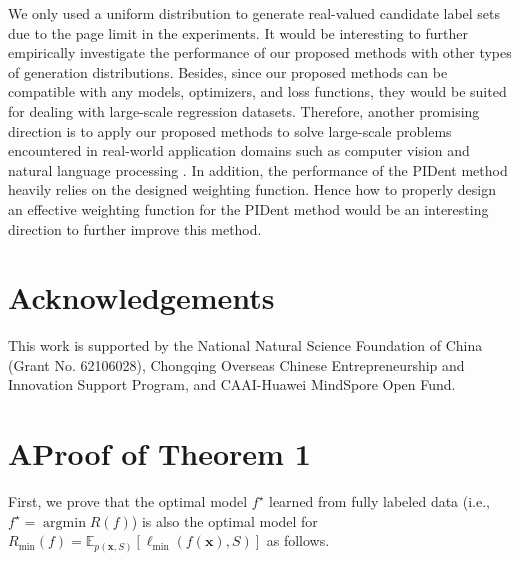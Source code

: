 \documentclass[letterpaper]{article} %
\newcommand{\argmin}{\mathop{\arg\min}}
\begin{document}
We only used a uniform distribution to generate real-valued candidate label sets due to the page limit in the experiments. It would be interesting to further empirically investigate the performance of our proposed methods with other types of generation distributions. Besides, since our proposed methods can be compatible with any models, optimizers, and loss functions, they would be suited for dealing with large-scale regression datasets. Therefore, another promising direction is to apply our proposed methods to solve large-scale problems encountered in real-world application domains such as computer vision \cite{szeliski2010computer} and natural language processing \cite{chowdhary2020natural}. In addition, the performance of the PIDent method heavily relies on the designed weighting function. Hence how to properly design an effective weighting function for the PIDent method would be an interesting direction to further improve this method.

\section*{Acknowledgements}
This work is supported by the National Natural Science Foundation of China (Grant No. 62106028), Chongqing Overseas Chinese Entrepreneurship and Innovation Support Program, and CAAI-Huawei MindSpore Open Fund.




\appendix
\section{A\quad Proof of Theorem 1}
First, we prove that the optimal model $f^\star$ learned from fully labeled data (i.e., $f^\star = \argmin R(f)$) is also the optimal model for $R_{\mathrm{min}}(f)=\mathbb{E}_{p(\bm{x},S)}[\ell_{\mathrm{min}}(f(\bm{x}),S)]$ as follows. 
\end{document}
